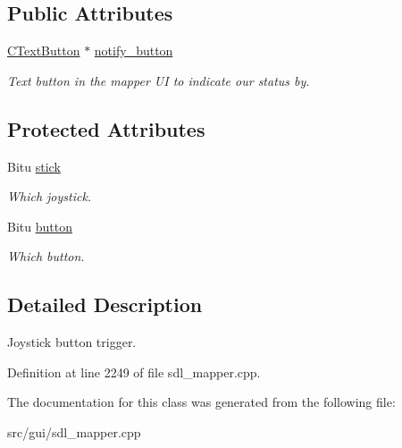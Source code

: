 \subsection*{Public Attributes}
\begin{DoxyCompactItemize}
\item 
\hypertarget{classCJButtonEvent_ac8c89511fdc9a86b4c187eec432445d2}{\hyperlink{classCTextButton}{C\-Text\-Button} $\ast$ \hyperlink{classCJButtonEvent_ac8c89511fdc9a86b4c187eec432445d2}{notify\-\_\-button}}\label{classCJButtonEvent_ac8c89511fdc9a86b4c187eec432445d2}

\begin{DoxyCompactList}\small\item\em Text button in the mapper U\-I to indicate our status by. \end{DoxyCompactList}\end{DoxyCompactItemize}
\subsection*{Protected Attributes}
\begin{DoxyCompactItemize}
\item 
\hypertarget{classCJButtonEvent_aa87062af5d8bc5db801066e2eb4a74f8}{Bitu \hyperlink{classCJButtonEvent_aa87062af5d8bc5db801066e2eb4a74f8}{stick}}\label{classCJButtonEvent_aa87062af5d8bc5db801066e2eb4a74f8}

\begin{DoxyCompactList}\small\item\em Which joystick. \end{DoxyCompactList}\item 
\hypertarget{classCJButtonEvent_abdbfaa23915b89b1392129c9525dd58d}{Bitu \hyperlink{classCJButtonEvent_abdbfaa23915b89b1392129c9525dd58d}{button}}\label{classCJButtonEvent_abdbfaa23915b89b1392129c9525dd58d}

\begin{DoxyCompactList}\small\item\em Which button. \end{DoxyCompactList}\end{DoxyCompactItemize}


\subsection{Detailed Description}
Joystick button trigger. 

Definition at line 2249 of file sdl\-\_\-mapper.\-cpp.



The documentation for this class was generated from the following file\-:\begin{DoxyCompactItemize}
\item 
src/gui/sdl\-\_\-mapper.\-cpp\end{DoxyCompactItemize}
